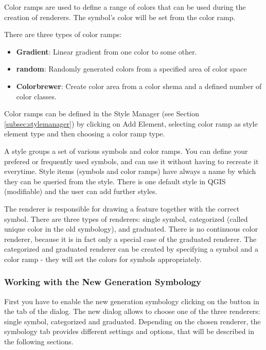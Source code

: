 
Color ramps are used to define a range of colors that can be used during 
the creation of renderers. The symbol's color will be set from the color ramp. 

There are three types of color ramps:

\begin{itemize}
\item \textbf{Gradient}: Linear gradient from one color to some other.
\item \textbf{random}: Randomly generated colors from a specified area of 
color space 
\item \textbf{Colorbrewer}: Create color area from a color shema and a defined 
number of color classes.
\end{itemize}

Color ramps can be defined in the Style Manager (see Section 
\ref{subsec:stylemanager}) by clicking on Add Element, selecting color ramp 
as style element type and then choosing a color ramp type.


A style groups a set of various symbols and color ramps. You can define your 
prefered or frequently used symbols, and can use it  without having to recreate 
it everytime. Style items (symbols and color ramps) have always a name by which 
they can be queried from the style. There is one default style in QGIS (modifiable) 
and the user can add further styles.


The renderer is responsible for drawing a feature together with the correct 
symbol. There are three types of renderers: single symbol, categorized (called 
unique color in the old symbology), and graduated. There is no continuous color 
renderer, because it is in fact only a special case of the graduated renderer. 
The categorized and graduated renderer can be created by specifying a symbol 
and a color ramp - they will set the colors for symbols appropriately. 

\subsubsection{Working with the New Generation Symbology}

First you have to enable the new generation symbology clicking on the 
 button in the  tab of the 
 dialog. The new dialog allows to choose one of the 
three renderers: single symbol, categorized and graduated. Depending on the 
chosen renderer, the symbology tab provides different settings and options, that 
will be described in the following sections.

